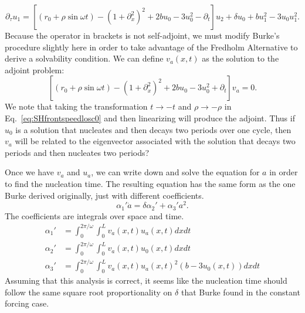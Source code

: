 \documentclass[pre,preprint,superscriptaddress]{revtex4-1}
\begin{document}
 \begin{equation}
\partial_{\tau} u_1=\left[(r_0 + \rho \sin\omega t) -\left(1+\partial_{x}^2\right)^2+2 b u_0-3u_0^2 -\partial_t\right] u_2 +\delta u_0 +bu_1^2-3u_0u_1^2 \label{eq:SH}.
\end{equation} 
Because the operator in brackets is not self-adjoint, we must modify Burke's procedure slightly here in order to take advantage of the Fredholm Alternative to derive a solvability condition.  We can define $v_a(x,t)$ as the solution to the adjoint problem:
 \begin{equation}
\left[(r_0 + \rho \sin\omega t) -\left(1+\partial_{x}^2\right)^2+2 b u_0-3u_0^2 +\partial_t\right] v_a = 0 \label{eq:SH}.
\end{equation} 
We note that taking the transformation $t\rightarrow -t$ and $\rho \rightarrow -\rho$ in Eq.~\ref{eq:SHfrontspeedlosc0} and then linearizing will produce the adjoint. Thus if $u_0$ is a solution that nucleates and then decays two periods over one cycle, then $v_a$ will be related to the eigenvector associated with the solution that decays two periods and then nucleates two periods?

Once we have $v_a$ and $u_a$, we can write down and solve the equation for $a$ in order to find the nucleation time.  The resulting equation has the same form as the one Burke derived originally, just with different coefficients.
\begin{equation}
 \alpha_1'\dot{a} =  \delta\alpha_2'+\alpha_3' a^2.
\end{equation}
The coefficients are integrals over space and time.
\begin{align}
\alpha_1'&=\int_0^{2\pi/\omega} \int_0^L v_a(x,t)u_a(x,t) dx dt\\ \nonumber
\alpha_2'&=\int_0^{2\pi/\omega} \int_0^L v_a(x,t) u_0(x,t) dxdt\\ \nonumber
\alpha_3'&=\int_0^{2\pi/\omega} \int_0^L v_a(x,t)u_a(x,t)^2(b- 3u_0(x,t)) dxdt
\end{align}
Assuming that this analysis is correct, it seems like the nucleation time should follow the same square root proportionality on $\delta$ that Burke found in the constant forcing case.



\end{document}
